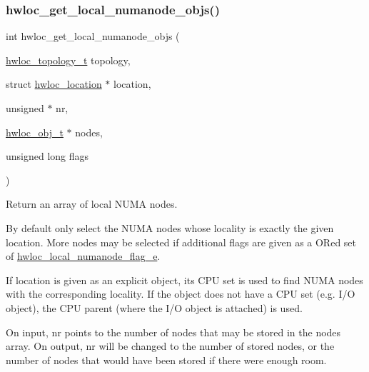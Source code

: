 \subsubsection{\texorpdfstring{hwloc\+\_\+get\+\_\+local\+\_\+numanode\+\_\+objs()}{hwloc\_get\_local\_numanode\_objs()}}
{\footnotesize\ttfamily int hwloc\+\_\+get\+\_\+local\+\_\+numanode\+\_\+objs (\begin{DoxyParamCaption}\item[{\hyperlink{a00186_ga9d1e76ee15a7dee158b786c30b6a6e38}{hwloc\+\_\+topology\+\_\+t}}]{topology,  }\item[{struct \hyperlink{a00314}{hwloc\+\_\+location} $\ast$}]{location,  }\item[{unsigned $\ast$}]{nr,  }\item[{\hyperlink{a00185_ga79b8ab56877ef99ac59b833203391c7d}{hwloc\+\_\+obj\+\_\+t} $\ast$}]{nodes,  }\item[{unsigned long}]{flags }\end{DoxyParamCaption})}



Return an array of local N\+U\+MA nodes. 

By default only select the N\+U\+MA nodes whose locality is exactly the given {\ttfamily location}. More nodes may be selected if additional flags are given as a OR\textquotesingle{}ed set of \hyperlink{a00211_gab9c963ca37255da71b00d94e1b106f9d}{hwloc\+\_\+local\+\_\+numanode\+\_\+flag\+\_\+e}.

If {\ttfamily location} is given as an explicit object, its C\+PU set is used to find N\+U\+MA nodes with the corresponding locality. If the object does not have a C\+PU set (e.\+g. I/O object), the C\+PU parent (where the I/O object is attached) is used.

On input, {\ttfamily nr} points to the number of nodes that may be stored in the {\ttfamily nodes} array. On output, {\ttfamily nr} will be changed to the number of stored nodes, or the number of nodes that would have been stored if there were enough room.

